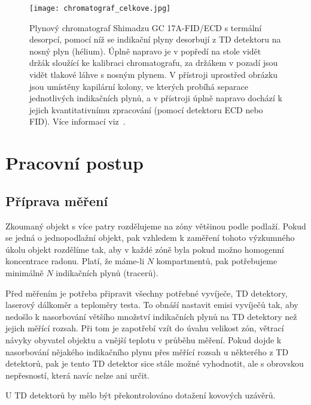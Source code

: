 \begin{figure}[ht]
    \centering
    \texttt{[image: chromatograf\_celkove.jpg]}
    \caption{Plynový chromatograf Shimadzu GC 17A-FID/ECD s termální desorpcí, pomocí níž se indikační plyny desorbují z TD detektoru na nosný plyn (hélium). Úplně napravo je v popředí na stole vidět držák sloužící ke kalibraci chromatografu, za držákem v pozadí jsou vidět tlakové láhve s nosným plynem. V přístroji uprostřed obrázku jsou umístěny kapilární kolony, ve kterých probíhá separace jednotlivých indikačních plynů, a v přístroji úplně napravo dochází k jejich kvantitativnímu zpracování (pomocí detektoru ECD nebo FID). Více informací viz~\cite{metodika}.}
    \label{fig:prutoky_chromatograf}
\end{figure}

\section{Pracovní postup}
\subsection{Příprava měření}
Zkoumaný objekt s více patry rozdělujeme na zóny většinou podle podlaží. Pokud se jedná o jednopodlažní objekt, pak vzhledem k zaměření tohoto výzkumného úkolu objekt rozdělíme tak, aby v každé zóně byla pokud možno homogenní koncentrace radonu. Platí, že máme-li $N$ kompartmentů, pak potřebujeme minimálně $N$ indikačních plynů (tracerů). 

Před měřením je potřeba připravit všechny potřebné vyvíječe, TD detektory, laserový dálkoměr a teploměry testa. To obnáší nastavit emisi vyvíječů tak, aby nedošlo k nasorbování většího množství indikačních plynů na TD detektory než jejich měřící rozsah. Při tom je zapotřebí vzít do úvahu velikost zón, větrací návyky obyvatel objektu a vnější teplotu v průběhu měření. Pokud dojde k nasorbování nějakého indikačního plynu přes měřící rozsah u některého z TD detektorů, pak je tento TD detektor sice stále možné vyhodnotit, ale s obrovskou nepřesností, která navíc nelze ani určit. 

U TD detektorů by mělo být překontrolováno dotažení kovových uzávěrů.
